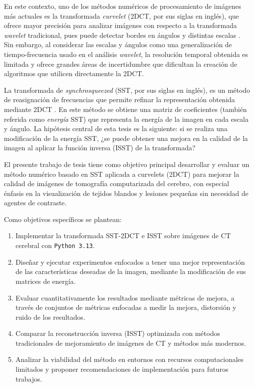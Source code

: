 En este contexto, uno de los métodos numéricos de procesamiento de imágenes más actuales es la transformada \emph{curvelet} (2DCT, por sus siglas en inglés), que ofrece mayor precisión para analizar imágenes con respecto a la transformada \emph{wavelet} tradicional, pues puede detectar bordes en ángulos y distintas escalas \cite{FastCurveletTransform}. Sin embargo, al considerar las escalas y ángulos como una generalización de tiempo-frecuencia usado en el análisis \emph{wavelet}, la resolución temporal obtenida es limitada y ofrece grandes áreas de incertidumbre que dificultan la creación de algoritmos que utilicen directamente la 2DCT.

La transformada de \emph{synchrosqueezed} (SST, por sus siglas en inglés), es un método de reasignación de frecuencias que permite refinar la representación obtenida mediante 2DCT \cite{SynchrosqueezedCurveletTransform}. En este método se obtiene una matriz de coeficientes (también referida como \emph{energía} SST) que representa la energía de la imagen en cada escala y ángulo. La hipótesis central de esta tesis es la siguiente: si se realiza una modificación de la energía SST, ¿se puede obtener una mejora en la calidad de la imagen al aplicar la función inversa (ISST) de la transformada?

El presente trabajo de tesis tiene como objetivo principal desarrollar y evaluar un método numérico basado en SST aplicada a curvelets (2DCT) para mejorar la calidad de imágenes de tomografía computarizada del cerebro, con especial énfasis en la visualización de tejidos blandos y lesiones pequeñas sin necesidad de agentes de contraste.

Como objetivos específicos se plantean:

\begin{enumerate}
    \item Implementar la transformada SST-2DCT e ISST sobre imágenes de CT cerebral con \texttt{Python 3.13}.
    \item Diseñar y ejecutar experimentos enfocados a tener una mejor representación de las características deseadas de la imagen, mediante la modificación de sus matrices de energía.
    \item Evaluar cuantitativamente los resultados mediante métricas de mejora, a través de conjuntos de métricas enfocadas a medir la mejora, distorsión y ruido de los resultados.
    \item Comparar la reconstrucción inversa (ISST) optimizada con métodos tradicionales de mejoramiento de imágenes de CT y métodos más modernos.
    \item Analizar la viabilidad del método en entornos con recursos computacionales limitados y proponer recomendaciones de implementación para futuros trabajos.
\end{enumerate}

